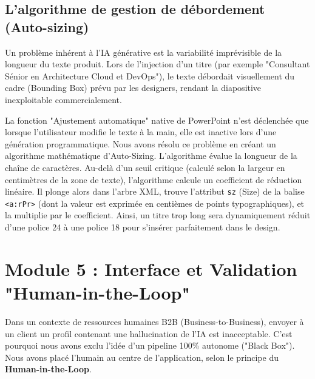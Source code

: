\subsection{L'algorithme de gestion de débordement (Auto-sizing)}
Un problème inhérent à l'IA générative est la variabilité imprévisible de la longueur du texte produit. Lors de l'injection d'un titre (par exemple "Consultant Sénior en Architecture Cloud et DevOps"), le texte débordait visuellement du cadre (Bounding Box) prévu par les designers, rendant la diapositive inexploitable commercialement. 

La fonction "Ajustement automatique" native de PowerPoint n'est déclenchée que lorsque l'utilisateur modifie le texte à la main, elle est inactive lors d'une génération programmatique.
Nous avons résolu ce problème en créant un algorithme mathématique d'Auto-Sizing. 
L'algorithme évalue la longueur de la chaîne de caractères. Au-delà d'un seuil critique (calculé selon la largeur en centimètres de la zone de texte), l'algorithme calcule un coefficient de réduction linéaire. Il plonge alors dans l'arbre XML, trouve l'attribut \texttt{sz} (Size) de la balise \texttt{<a:rPr>} (dont la valeur est exprimée en centièmes de points typographiques), et la multiplie par le coefficient. Ainsi, un titre trop long sera dynamiquement réduit d'une police 24 à une police 18 pour s'insérer parfaitement dans le design.


\section{Module 5 : Interface et Validation "Human-in-the-Loop"}

Dans un contexte de ressources humaines B2B (Business-to-Business), envoyer à un client un profil contenant une hallucination de l'IA est inacceptable. C'est pourquoi nous avons exclu l'idée d'un pipeline 100\% autonome ("Black Box"). Nous avons placé l'humain au centre de l'application, selon le principe du \textbf{Human-in-the-Loop}.

